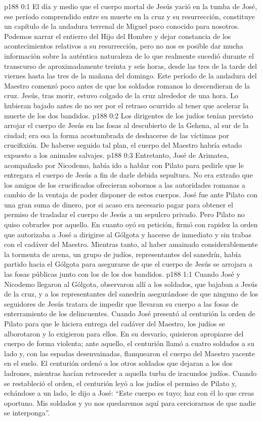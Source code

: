\author{Comisión de seres intermedios}
\vs p188 0:1 El día y medio que el cuerpo mortal de Jesús yació en la tumba de José, ese período comprendido entre su muerte en la cruz y su resurrección, constituye un capítulo de la andadura terrenal de Miguel poco conocido para nosotros. Podemos narrar el entierro del Hijo del Hombre y dejar constancia de los acontecimientos relativos a su resurrección, pero no nos es posible dar mucha información sobre la auténtica naturaleza de lo que realmente sucedió durante el transcurso de aproximadamente treinta y seis horas, desde las tres de la tarde del viernes hasta las tres de la mañana del domingo. Este período de la andadura del Maestro comenzó poco antes de que los soldados romanos lo descendieran de la cruz. Jesús, tras morir, estuvo colgado de la cruz alrededor de una hora. Lo hubieran bajado antes de no ser por el retraso ocurrido al tener que acelerar la muerte de los dos bandidos.
\vs p188 0:2 Los dirigentes de los judíos tenían previsto arrojar el cuerpo de Jesús en las fosas al descubierto de la Gehena, al sur de la ciudad; era esa la forma acostumbrada de deshacerse de las víctimas por crucifixión. De haberse seguido tal plan, el cuerpo del Maestro habría estado expuesto a los animales salvajes.
\vs p188 0:3 Entretanto, José de Arimatea, acompañado por Nicodemo, había ido a hablar con Pilato para pedirle que le entregara el cuerpo de Jesús a fin de darle debida sepultura. No era extraño que los amigos de los crucificados ofrecieran sobornos a las autoridades romanas a cambio de la ventaja de poder disponer de estos cuerpos. José fue ante Pilato con una gran suma de dinero, por si acaso era necesario pagar para obtener el permiso de trasladar el cuerpo de Jesús a un sepulcro privado. Pero Pilato no quiso cobrarles por aquello. En cuanto oyó su petición, firmó con rapidez la orden que autorizaba a José a dirigirse al Gólgota y hacerse de inmediato y sin trabas con el cadáver del Maestro. Mientras tanto, al haber amainado considerablemente la tormenta de arena, un grupo de judíos, representantes del sanedrín, había partido hacia el Gólgota para asegurarse de que el cuerpo de Jesús se arrojara a las fosas públicas junto con los de los dos bandidos.
\vs p188 1:1 Cuando José y Nicodemo llegaron al Gólgota, observaron allí a los soldados, que bajaban a Jesús de la cruz, y a los representantes del sanedrín asegurándose de que ninguno de los seguidores de Jesús tratara de impedir que llevaran su cuerpo a las fosas de enterramiento de los delincuentes. Cuando José presentó al centurión la orden de Pilato para que le hiciera entrega del cadáver del Maestro, los judíos se alborotaron y lo exigieron para ellos. En su desvarío, quisieron apropiarse del cuerpo de forma violenta; ante aquello, el centurión llamó a cuatro soldados a su lado y, con las espadas desenvainadas, flanquearon el cuerpo del Maestro yacente en el suelo. El centurión ordenó a los otros soldados que dejaran a los dos ladrones, mientras hacían retroceder a aquella turba de iracundos judíos. Cuando se restableció el orden, el centurión leyó a los judíos el permiso de Pilato y, echándose a un lado, le dijo a José: “Este cuerpo es tuyo; haz con él lo que creas oportuno. Mis soldados y yo nos quedaremos aquí para cerciorarnos de que nadie se interponga”.
